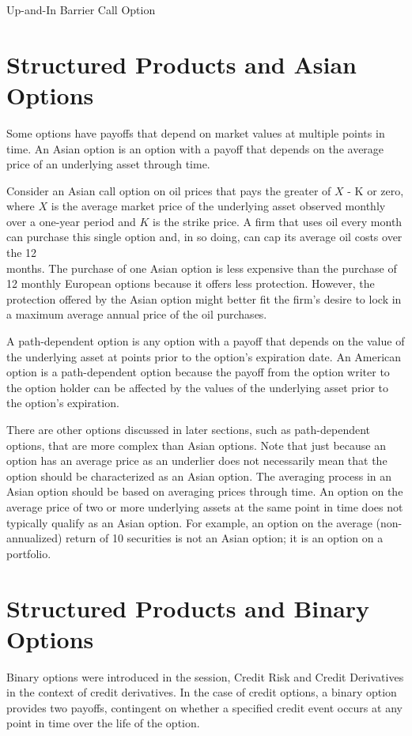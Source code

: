 \documentclass[11pt]{article}
\begin{document}
Up-and-In Barrier Call Option

\section*{Structured Products and Asian Options}
Some options have payoffs that depend on market values at multiple points in time. An Asian option is an option with a payoff that depends on the average price of an underlying asset through time.

Consider an Asian call option on oil prices that pays the greater of $X$ - K or zero, where $X$ is the average market price of the underlying asset observed monthly over a one-year period and $K$ is the strike price. A firm that uses oil every month can purchase this single option and, in so doing, can cap its average oil costs over the 12\\
months. The purchase of one Asian option is less expensive than the purchase of 12 monthly European options because it offers less protection. However, the protection offered by the Asian option might better fit the firm's desire to lock in a maximum average annual price of the oil purchases.

A path-dependent option is any option with a payoff that depends on the value of the underlying asset at points prior to the option's expiration date. An American option is a path-dependent option because the payoff from the option writer to the option holder can be affected by the values of the underlying asset prior to the option's expiration.

There are other options discussed in later sections, such as path-dependent options, that are more complex than Asian options. Note that just because an option has an average price as an underlier does not necessarily mean that the option should be characterized as an Asian option. The averaging process in an Asian option should be based on averaging prices through time. An option on the average price of two or more underlying assets at the same point in time does not typically qualify as an Asian option. For example, an option on the average (non-annualized) return of 10 securities is not an Asian option; it is an option on a portfolio.

\section*{Structured Products and Binary Options}
Binary options were introduced in the session, Credit Risk and Credit Derivatives in the context of credit derivatives. In the case of credit options, a binary option provides two payoffs, contingent on whether a specified credit event occurs at any point in time over the life of the option.
\end{document}

